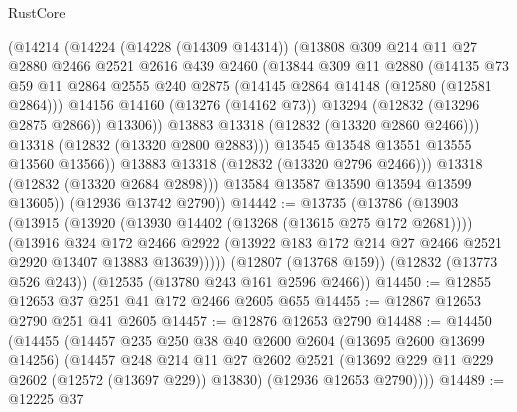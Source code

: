 \begin{lexlean}{RustCore}
\begin{coremodule}
                (@14214
                  (@14224
                    (@14228 (@14309 @14314))
                    (@13808
                      @309
                      @214
                      @11
                      @27
                      @2880
                      @2466
                      @2521
                      @2616
                      @439
                      @2460
                      (@13844
                        @309
                        @11
                        @2880
                        (@14135
                          @73
                          @59
                          @11
                          @2864
                          @2555
                          @240
                          @2875
                          (@14145 @2864 @14148 (@12580 (@12581 @2864)))
                          @14156
                          @14160
                          (@13276 (@14162 @73))
                          @13294
                          (@12832 (@13296 @2875 @2866))
                          @13306))
                      @13883
                      @13318
                      (@12832 (@13320 @2860 @2466)))
                    @13318
                    (@12832 (@13320 @2800 @2883)))
                  @13545
                  @13548
                  @13551
                  @13555
                  @13560
                  @13566))
              @13883
              @13318
              (@12832 (@13320 @2796 @2466)))
            @13318
            (@12832 (@13320 @2684 @2898)))
          @13584
          @13587
          @13590
          @13594
          @13599
          @13605))
      (@12936 @13742 @2790))
@14442 := @13735
    (@13786
      (@13903
        (@13915
          (@13920 (@13930 @14402 (@13268 (@13615 @275 @172 @2681))))
          (@13916
            @324
            @172
            @2466
            @2922
            (@13922 @183 @172 @214 @27 @2466 @2521 @2920 @13407 @13883 @13639)))))
    (@12807 (@13768 @159))
    (@12832 (@13773 @526 @243))
    (@12535 (@13780 @243 @161 @2596 @2466))
@14450 := @12855 @12653 @37 @251 @41 @172 @2466 @2605 @655
@14455 := @12867 @12653 @2790 @251 @41 @2605
@14457 := @12876 @12653 @2790
@14488 := @14450
    (@14455
      (@14457
        @235
        @250
        @38
        @40
        @2600
        @2604
        (@13695 @2600 @13699 @14256)
        (@14457
          @248
          @214
          @11
          @27
          @2602
          @2521
          (@13692 @229 @11 @229 @2602 (@12572 (@13697 @229)) @13830)
          (@12936 @12653 @2790))))
@14489 := @12225 @37

\end{coremodule}
\end{lexlean}
